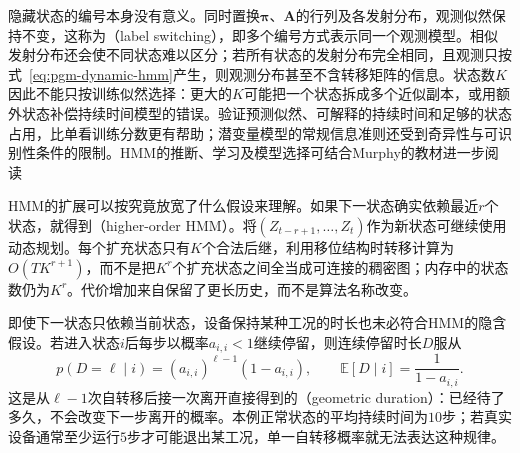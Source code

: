 隐藏状态的编号本身没有意义。同时置换$\bm{\pi}$、$\bm{A}$的行列及各发射分布，观测似然保持不变，这称为（label switching），即多个编号方式表示同一个观测模型。相似发射分布还会使不同状态难以区分；若所有状态的发射分布完全相同，且观测只按式~\eqref{eq:pgm-dynamic-hmm}产生，则观测分布甚至不含转移矩阵的信息。状态数$K$因此不能只按训练似然选择：更大的$K$可能把一个状态拆成多个近似副本，或用额外状态补偿持续时间模型的错误。验证预测似然、可解释的持续时间和足够的状态占用，比单看训练分数更有帮助；潜变量模型的常规信息准则还受到奇异性与可识别性条件的限制。HMM的推断、学习及模型选择可结合Murphy的教材进一步阅读

HMM的扩展可以按究竟放宽了什么假设来理解。如果下一状态确实依赖最近$r$个状态，就得到（higher-order HMM）。将$(Z_{t-r+1},\ldots,Z_t)$作为新状态可继续使用动态规划。每个扩充状态只有$K$个合法后继，利用移位结构时转移计算为$O(TK^{r+1})$，而不是把$K^r$个扩充状态之间全当成可连接的稠密图；内存中的状态数仍为$K^r$。代价增加来自保留了更长历史，而不是算法名称改变。

即使下一状态只依赖当前状态，设备保持某种工况的时长也未必符合HMM的隐含假设。若进入状态$i$后每步以概率$a_{i,i}<1$继续停留，则连续停留时长$D$服从
\begin{equation}
  p(D=\ell\mid i)=(a_{i,i})^{\ell-1}(1-a_{i,i}),
  \qquad
  \mathbb{E}[D\mid i]=\frac{1}{1-a_{i,i}}.
  \label{eq:pgm-dynamic-geometric-duration}
\end{equation}
这是从$\ell-1$次自转移后接一次离开直接得到的（geometric duration）：已经待了多久，不会改变下一步离开的概率。本例正常状态的平均持续时间为$10$步；若真实设备通常至少运行$5$步才可能退出某工况，单一自转移概率就无法表达这种规律。

